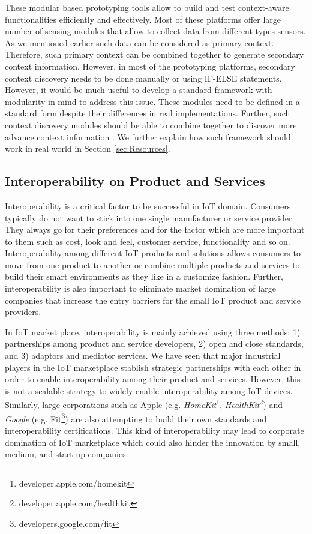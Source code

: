 \documentclass[journal]{IEEEtran}
\begin{document}
 These modular based prototyping tools allow to build and test context-aware functionalities efficiently and effectively. Most of these platforms offer large number of sensing modules that allow to collect data from different types sensors. As we mentioned earlier such data can be considered as primary context. Therefore, such primary context can be combined together to generate secondary context information. However, in most of the prototyping platforms, secondary context discovery needs to be done manually or using IF-ELSE statements. However, it would be much useful to develop a standard framework with modularity in mind to address this issue. These modules need to be defined in a standard form despite their differences in real implementations. Further, such context discovery modules should be able to combine together to discover more advance context information \cite{IA001}. We further explain how such framework should work in real world in Section \ref{sec:Resources}.
 
 

 
 
 
 
 
  \subsection{Interoperability on Product and Services}
\label{sec:Interoperability}
Interoperability is a critical factor to be successful in IoT domain. Consumers typically do not want to stick into one single manufacturer or service provider. They always go for their preferences and for the factor which are more important to them such as cost, look and feel, customer service, functionality and so on. Interoperability among different IoT products and solutions allows consumers to move from one product to another or combine multiple products and services to build their smart environments as they like in a customize fashion. Further, interoperability \cite{IA07} is also important to eliminate market domination of large companies that increase the entry barriers for the small IoT product and service providers.

In IoT market place, interoperability is mainly achieved using three methods: 1) partnerships among product and service developers, 2) open and close standards, and 3) adaptors and mediator services. We have seen that major industrial players in the IoT marketplace stablish strategic partnerships with each other in order to enable interoperability among their product and services. However, this is not a scalable strategy to widely enable interoperability among IoT devices. Similarly, large corporations such as Apple (e.g. \textit{HomeKit}\footnote{developer.apple.com/homekit}, \textit{HealthKit}\footnote{developer.apple.com/healthkit}) and \textit{Google} (e.g. Fit\footnote{developers.google.com/fit}) are also attempting to build their own standards and interoperability certifications. This kind of interoperability may lead to corporate domination of IoT marketplace which could also hinder the innovation by small, medium, and start-up companies.
\end{document}
